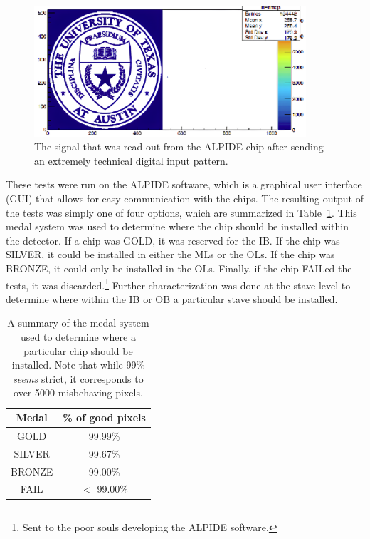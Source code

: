 \begin{figure}
    \centering
    \includegraphics[width=0.9\textwidth]{figures/experiment/ut_alpide.png}
    \caption{The signal that was read out from the ALPIDE chip after sending an extremely technical digital input pattern.}
    \label{fig:ut_alpide}
\end{figure}

These tests were run on the ALPIDE software, which is a graphical user interface (GUI) that allows for easy communication with the chips. The resulting output of the tests was simply one of four options, which are summarized in Table~\ref{tab:chip_medals}. This medal system was used to determine where the chip should be installed within the detector. If a chip was GOLD, it was reserved for the IB. If the chip was SILVER, it could be installed in either the MLs or the OLs. If the chip was BRONZE, it could only be installed in the OLs. Finally, if the chip FAILed the tests, it was discarded.\footnote{Sent to the poor souls developing the ALPIDE software.} Further characterization was done at the stave level to determine where within the IB or OB a particular stave should be installed.

\begin{table}
    \centering
    \caption{A summary of the medal system used to determine where a particular chip should be installed. Note that while 99\% \textit{seems} strict, it corresponds to over 5000 misbehaving pixels.}
    \begin{tabular}{|c|c|}
        \hline
        \textbf{Medal} & \textbf{\% of good pixels} \\
        \hline
        GOLD & 99.99\% \\
        SILVER & 99.67\% \\
        BRONZE & 99.00\% \\
        FAIL &  $<$ 99.00\% \\
        \hline
    \end{tabular}
    \label{tab:chip_medals}
\end{table}

